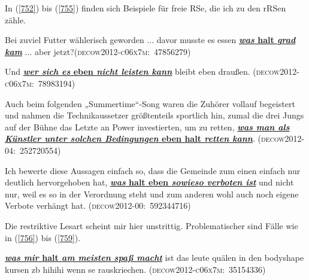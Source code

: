 \label{sec:berstruk}
In (\ref{752}) bis (\ref{755}) finden sich Beispiele für  freie RSe, die ich zu den rRSen zähle.
	
\begin{exe}
	\ex\label{752} 
	Bei zuviel Futter wählerisch geworden ... davor musste es essen \ul{\textbf{\textit{was} halt \textit{grad kam}}} ... aber jetzt?\hbox{}\hfill\hbox{\scshape(decow2012-c06x7m: 47856279)}
\end{exe}

\begin{exe}
	\ex\label{753} 
	Und \ul{\textbf{\textit{wer sich es} eben \textit{nicht leisten kann}}} bleibt eben draußen.
	\newline		
	\hbox{}\hfill\hbox{\scshape(decow2012-c06x7m: 78983194)}	
\end{exe}			       

\begin{exe}
	\ex\label{754} 

	Auch beim folgenden „Summertime“-Song waren die Zuhörer vollauf begeistert und nahmen die Technikaussetzer 			größtenteils sportlich hin, zumal die drei Jungs auf der Bühne das Letzte an Power investierten, um zu retten, \ul{\textbf{\textit{was man als Künstler unter solchen Bedingungen} eben halt \textit{retten kann}}}.                                               
	\hbox{}\hfill\hbox{\scshape(decow2012-04: 252720554)}
\end{exe}
 
\begin{exe}
	\ex\label{755} 

	Ich bewerte diese Aussagen einfach so, dass die Gemeinde zum einen einfach nur deutlich hervorgehoben hat, \ul{\textbf{\textit{was} halt eben \textit{sowieso verboten ist}}} und nicht nur, weil es so in der Verordnung steht 	und zum anderen wohl auch noch eigene Verbote verhängt hat. 
	\hfill\hbox{\scshape(decow2012-00: 592344716)}
\end{exe} 
Die restriktive Lesart scheint mir hier unstrittig. Problematischer sind Fälle wie in (\ref{756}) bis (\ref{759}). 

\begin{exe}
	\ex\label{756} 

	\ul{\textbf{\textit{was mir} halt \textit{am meisten spaß macht}}} ist das leute quälen in den bodyshape kursen zb hihihi wenn se rauskriechen.                                                                            
	\newline\hbox{}\hfill\hbox{\scshape(decow2012-c06x7m: 35154336)}
\end{exe} 

